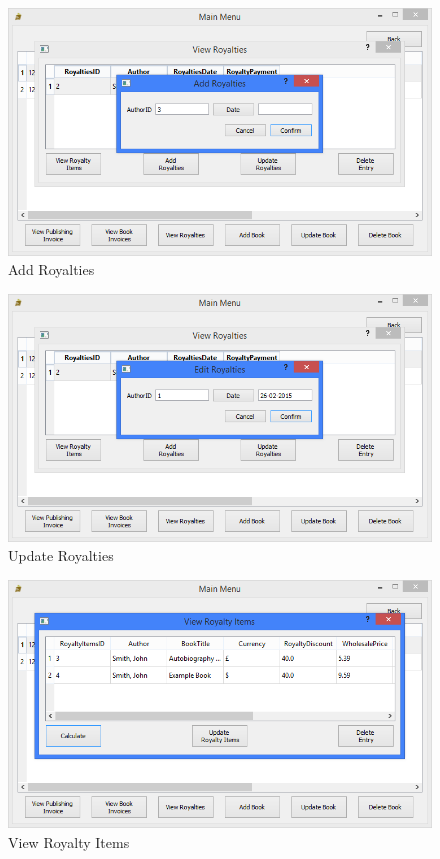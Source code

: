 \begin{figure}[H]
    \caption{Add Royalties} \label{fig:AddRoyalties}
    \includegraphics[width=\textwidth]{./Maintenance/UserInterface/AddRoyalties.png}
\end{figure}

\begin{figure}[H]
    \caption{Update Royalties} \label{fig:UpdateRoyalties}
    \includegraphics[width=\textwidth]{./Maintenance/UserInterface/UpdateRoyalties.png}
\end{figure}

\begin{figure}[H]
    \caption{View Royalty Items} \label{fig:ViewRoyaltyItems}
    \includegraphics[width=\textwidth]{./Maintenance/UserInterface/ViewRoyaltyItems.png}
\end{figure}

